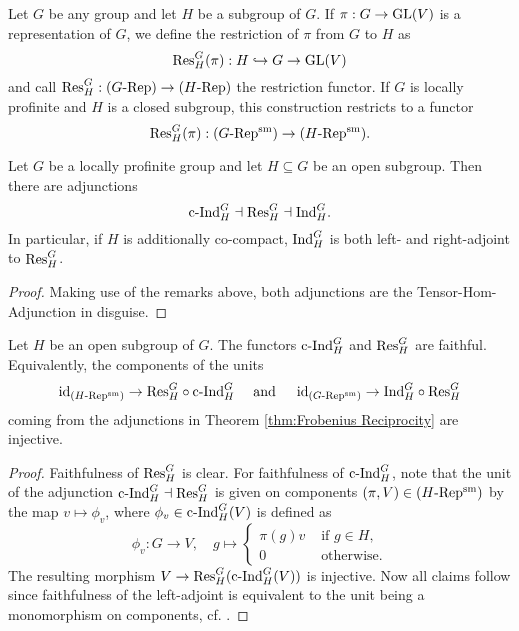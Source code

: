 \documentclass[../main.tex]{subfiles}
\begin{document}
\begin{defi}\label{def:RestrictionFunctor}
  Let $G$ be any group and let $H$ be a subgroup of $G$.
  If $\pi: G \to \operatorname{GL}(V)$ is a representation of $G$, we define the
  restriction of $\pi$ from $G$ to $H$ as
  \begin{equation*}
    \mathrm{Res}_H^G(\pi): H \hookrightarrow G \to \operatorname{GL}(V)
  \end{equation*}
  and call $\mathrm{Res}_H^G: {({G}\text-\allowbreak\mathrm{Rep})} \to {({H}\text-\allowbreak\mathrm{Rep})}$ the restriction functor.  
If $G$ is locally profinite and $H$ is a closed subgroup, this construction restricts
to a functor
\begin{equation*}
  \mathrm{Res}_H^G(\pi): {({G}\text-\allowbreak\mathrm{Rep^{\mathrm{sm}}})} \to {({H}\text-\allowbreak\mathrm{Rep^{\mathrm{sm}}})}.
\end{equation*}
\end{defi}

\begin{thm}\label{thm:Frobenius Reciprocity}
  Let $G$ be a locally profinite group and let $H \subseteq G$ be an open subgroup.
  Then there are adjunctions
  \begin{equation*}
    \mathrm{c\text{-}Ind}_H^G \dashv \mathrm{Res}_H^G \dashv \mathrm{Ind}_H^G.
  \end{equation*}
  In particular, if $H$ is additionally co-compact, $\mathrm{Ind}_H^G$ is both left-
  and right-adjoint to $\mathrm{Res}_H^G$.
\begin{proof}
  Making use of the remarks above, both adjunctions are the
  Tensor-Hom-Adjunction in disguise. 
\end{proof}
\end{thm}

\begin{lem}\label{lem:FrobRecUnitsAreInjective}
  Let $H$ be an open subgroup of $G$. 
  The functors $\mathrm{c\text{-}Ind}_H^G$ and $\mathrm{Res}_H^G$ are faithful. 
  Equivalently, the components of the units
  \begin{equation*}
    \operatorname{id}_{{({H}\text-\allowbreak\mathrm{Rep^{\mathrm{sm}}})}} \to \mathrm{Res}_H^G \circ \mathrm{c\text{-}Ind}_H^G \quad \text{ and } \quad 
    \operatorname{id}_{{({G}\text-\allowbreak\mathrm{Rep^{\mathrm{sm}}})}} \to \mathrm{Ind}_H^G \circ \mathrm{Res}_H^G
  \end{equation*}
  coming from the adjunctions in Theorem \ref{thm:Frobenius Reciprocity} are
  injective. 
\begin{proof}
  Faithfulness of $\mathrm{Res}_H^G$ is clear. For faithfulness of $\mathrm{c\text{-}Ind}_H^G$, note that 
  the unit of the adjunction $\mathrm{c\text{-}Ind}_H^G \dashv \mathrm{Res}_H^G$ is given 
  on components $(\pi, V) \in {({H}\text-\allowbreak\mathrm{Rep^{\mathrm{sm}}})}$ by the map 
  $v \mapsto \phi_v$, where $\phi_v \in \mathrm{c\text{-}Ind}_H^G(V)$ is defined as
  \begin{equation*}
    \phi_v: G \to V, \quad g \mapsto \begin{cases}
      \pi(g)v &\text{ if } g \in H,\\
      0       &\text{ otherwise.}
    \end{cases}
  \end{equation*}
  The resulting morphism $V \to \mathrm{Res}_H^G ( \mathrm{c\text{-}Ind}_H^G(V))$ is injective. Now all
  claims follow since faithfulness of the left-adjoint is 
  equivalent to the unit being a monomorphism on components, cf. \cite[Lemma
  4.5.13]{riehl2017category}.
\end{proof}
\end{lem}
\end{document}
